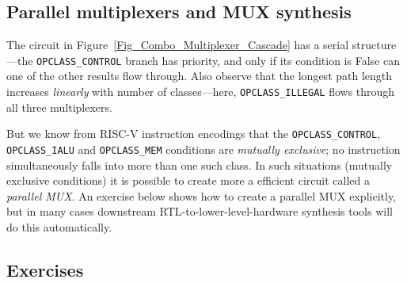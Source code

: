 
\subsection{Parallel multiplexers and MUX synthesis}


The circuit in Figure~\ref{Fig_Combo_Multiplexer_Cascade} has a
serial structure---the \verb|OPCLASS_CONTROL| branch has priority, and
only if its condition is False can one of the other results flow
through.  Also observe that the longest path length increases
\emph{linearly} with number of classes---here, \verb|OPCLASS_ILLEGAL|
flows through all three multiplexers.

But we know from RISC-V instruction encodings that the
\verb|OPCLASS_CONTROL|, \verb|OPCLASS_IALU| and \verb|OPCLASS_MEM|
conditions are \emph{mutually exclusive}; no instruction
simultaneously falls into more than one such class.  In such
situations (mutually exclusive conditions) it is possible to create
more a efficient circuit called a \emph{parallel MUX}.  An exercise
below shows how to create a parallel MUX explicitly, but in many cases
downstream RTL-to-lower-level-hardware synthesis tools will do this
automatically.


\subsection{Exercises}

